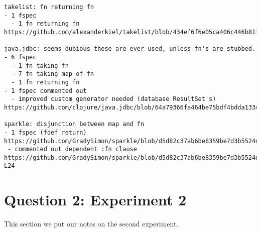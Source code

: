 \begin{verbatim}
takelist: fn returning fn
- 1 fspec
  - 1 fn returning fn
https://github.com/alexanderkiel/takelist/blob/434ef6f6e05ca406c446b81fa5a77c7f0519c355/src/takelist/app.clj#L27

java.jdbc: seems dubious these are ever used, unless fn's are stubbed.
- 6 fspec
  - 1 fn taking fn
  - 7 fn taking map of fn
  - 1 fn returning fn
- 1 fspec commented out
  - improved custom generator needed (database ResultSet's)
https://github.com/clojure/java.jdbc/blob/64a79366fa464be75bdf4bdda133441b9d1efb26/src/main/clojure/clojure/java/jdbc/spec.clj#L124

sparkle: disjunction between map and fn
- 1 fspec (fdef return)
https://github.com/GradySimon/sparkle/blob/d5d82c37ab6be8359be7d3b5524d8b32dac452a1/src/sparkle/layer.clj#L9
 - commented out dependent :fn clause
https://github.com/GradySimon/sparkle/blob/d5d82c37ab6be8359be7d3b5524d8b32dac452a1/src/sparkle/spec.clj#L18-L24
\end{verbatim}
\endgroup

\section{Question 2: Experiment 2}
\label{appendix2}

This section we put our notes on the second experiment.

